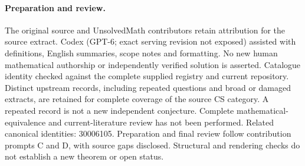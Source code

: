 \documentclass[11pt]{article}
\begin{document}
\paragraph{Preparation and review.}
The original source and UnsolvedMath contributors retain attribution for the source extract. Codex (GPT-6; exact serving revision not exposed) assisted with definitions, English summaries, scope notes and formatting. No new human mathematical authorship or independently verified solution is asserted. Catalogue identity checked against the complete supplied registry and current repository. Distinct upstream records, including repeated questions and broad or damaged extracts, are retained for complete coverage of the source CS category. A repeated record is not a new independent conjecture. Complete mathematical-equivalence and current-literature review has not been performed. Related canonical identities: 30006105. Preparation and final review follow contribution prompts C and D, with source gaps disclosed. Structural and rendering checks do not establish a new theorem or open status.
\label{end:statement}
\end{document}
